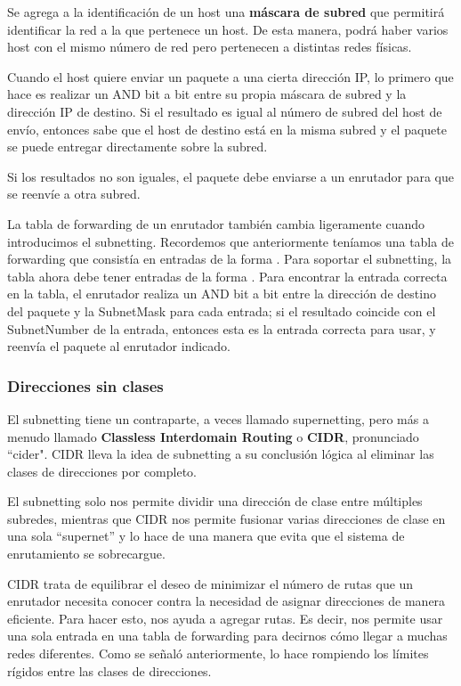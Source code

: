 Se agrega a la identificación de un host una \textbf{máscara de subred} que permitirá identificar la red a la que pertenece un host. De esta manera, podrá haber varios host con el mismo número de red pero pertenecen a distintas redes físicas. 

Cuando el host quiere enviar un paquete a una cierta dirección IP, lo primero que hace es realizar un AND bit a bit entre su propia máscara de subred y la dirección IP de destino. Si el resultado es igual al número de subred del host de envío, entonces sabe que el host de destino está en la misma subred y el paquete se puede entregar directamente sobre la subred.

Si los resultados no son iguales, el paquete debe enviarse a un enrutador para que se reenvíe a otra subred.

La tabla de forwarding de un enrutador también cambia ligeramente cuando introducimos el subnetting. Recordemos que anteriormente teníamos una tabla de forwarding que consistía en entradas de la forma \(<NetworkNum, NextHop>\). Para soportar el subnetting, la tabla ahora debe tener entradas de la forma \(<SubnetNumber, SubnetMask, NextHop>\). Para encontrar la entrada correcta en la tabla, el enrutador realiza un AND bit a bit entre la dirección de destino del paquete y la SubnetMask para cada entrada; si el resultado coincide con el SubnetNumber de la entrada, entonces esta es la entrada correcta para usar, y reenvía el paquete al enrutador indicado.

\subsubsection{Direcciones sin clases}
El subnetting tiene un contraparte, a veces llamado supernetting, pero más a menudo llamado \textbf{Classless Interdomain Routing} o \textbf{CIDR}, pronunciado ``cider". CIDR lleva la idea de subnetting a su conclusión lógica al eliminar las clases de direcciones por completo. 

El subnetting solo nos permite dividir una dirección de clase entre múltiples subredes, mientras que CIDR nos permite fusionar varias direcciones de clase en una sola ``supernet'' y lo hace de una manera que evita que el sistema de enrutamiento se sobrecargue.


CIDR trata de equilibrar el deseo de minimizar el número de rutas que un enrutador necesita conocer contra la necesidad de asignar direcciones de manera eficiente. Para hacer esto, nos ayuda a agregar rutas. Es decir, nos permite usar una sola entrada en una tabla de forwarding para decirnos cómo llegar a muchas redes diferentes. Como se señaló anteriormente, lo hace rompiendo los límites rígidos entre las clases de direcciones.

